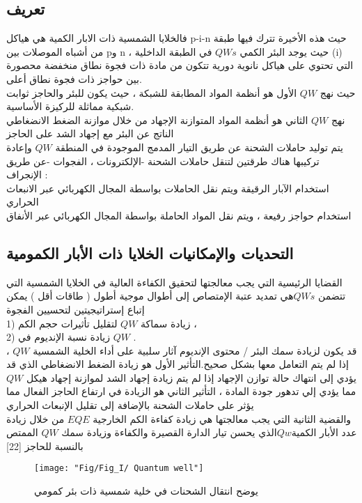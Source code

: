 	\subsection{تعريف}
	فالخلايا الشمسية ذات الابار الكمية هي هياكل p-i-n حيث هذه الأخيرة تترك فيها طبقة من أشباه الموصلات بين pو  n ، حيث يوجد البئر الكمي  $ QWs $ في الطبقة الداخلية (i) التي تحتوي على هياكل نانوية دورية تتكون من مادة ذات فجوة نطاق منخفضة  محصورة بين حواجز ذات فجوة نطاق أعلى. 
	\\
	حيث نهج $ QW $ الأول هو أنظمة المواد المطابقة للشبكة ، حيث يكون للبئر 
	والحاجز ثوابت شبكية مماثلة للركيزة الأساسية.
	\\
	نهج $ QW $ الثاني هو أنظمة المواد المتوازنة الإجهاد  من خلال موازنة الضغط الانضغاطي الناتج عن البئر مع إجهاد الشد على الحاجز
	\\
	يتم توليد حاملات الشحنة عن طريق التيار المدمج الموجودة في المنطقة $ QW $  وإعادة تركيبها هناك طرقتين لتنقل  حاملات الشحنة -الإلكترونات ، الفجوات -عن طريق الإنجراف : 
	\\
	استخدام الآبار الرقيقة ويتم نقل الحاملات  بواسطة المجال الكهربائي عبر الانبعاث الحراري
	\\
	استخدام حواجز رفيعة ، ويتم نقل المواد الحاملة بواسطة المجال الكهربائي عبر الأنفاق
	
	
	
	\subsection{التحديات والإمكانيات الخلايا ذات الأبار الكمومية }
	القضايا الرئيسية التي يجب معالجتها لتحقيق الكفاءة العالية في الخلايا الشمسية التي تتضمن $ QWs  $هي تمديد عتبة الإمتصاص إلى أطوال موجية أطول ( طاقات أقل )  يمكن إتباع إستراتيجيتين لتحسيين الفجوة 
	\\
	1) زيادة سماكة $ QW $ لتقليل تأثيرات حجم الكم ، 
	\\
	2) زيادة نسبة الإنديوم في $ QW $ .
	\\
	قد يكون لزيادة سمك البئر / محتوى الإنديوم آثار سلبية على أداء الخلية الشمسية $ QW $ ، إذا لم يتم التعامل معها بشكل صحيح.التأثير الأول هو زيادة الضغط الانضغاطي الذي قد يؤدي إلى انتهاك حالة توازن الإجهاد إذا لم يتم زيادة إجهاد الشد لموازنة إجهاد هيكل $ QW $ مما يؤدي إلي تدهور جودة المادة ، التأثير الثاني هو الزيادة في ارتفاع الحاجز الفعال مما يؤثر على حاملات الشحنة بالإضافة إلى تقليل الإنبعاث الحراري 
	\\
	والقضية الثانية التي يجب معالجتها  هي زيادة كفاءة الكم الخارجية $ EQE $ من خلال زيادة عدد الأبار الكمية$ Qw  $الذي يحسن تيار الدارة القصيرة والكفاءة وزيادة سمك $ QW $ الممتص بالنسبة للحاجز 
	[22]
	\begin{figure}[h!]
		\centering
		\texttt{[image: "Fig/Fig\_I/ Quantum well"]}
		\caption{يوضح انتقال الشحنات في خلية شمسية ذات بئر كمومي}
		\label{fig:-quantum-well}
	\end{figure}
	\FloatBarrier
